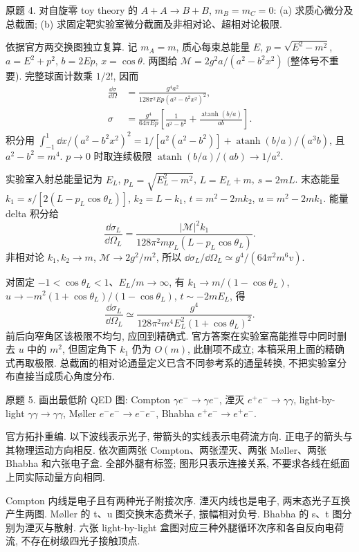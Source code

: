 \begin{exercise}\label{ex:8701-2-4}
原题 4. 对自旋零 toy theory 的 $A+A\to B+B$, $m_B=m_C=0$: (a) 求质心微分及总截面; (b) 求固定靶实验室微分截面及非相对论、超相对论极限.
\end{exercise}
\begin{solution}
依据官方两交换图独立复算. 记 $m_A=m$, 质心每束总能量 $E$, $p=\sqrt{E^2-m^2}$, $a=E^2+p^2$, $b=2Ep$, $x=\cos\theta$. 两图给 $\mathcal M=2g^2a/(a^2-b^2x^2)$ (整体号不重要). 完整球面计数乘 $1/2!$, 因而
\begin{align*}
 \frac{\dd\sigma}{\dd\Omega}&=\frac{g^4a^2}{128\pi^2E p(a^2-b^2x^2)^2},\\
 \sigma&=\frac{g^4}{64\pi E p}
 \left[\frac1{a^2-b^2}+\frac{\operatorname{atanh}(b/a)}{ab}\right].
\end{align*}
积分用 $\int_{-1}^1\dd x/(a^2-b^2x^2)^2=1/[a^2(a^2-b^2)]+\operatorname{atanh}(b/a)/(a^3b)$, 且 $a^2-b^2=m^4$. $p\to0$ 时取连续极限 $\operatorname{atanh}(b/a)/(ab)\to1/a^2$.

实验室入射总能量记为 $E_L$, $p_L=\sqrt{E_L^2-m^2}$, $L=E_L+m$, $s=2mL$. 末态能量 $k_1=s/[2(L-p_L\cos\theta_L)]$, $k_2=L-k_1$, $t=m^2-2mk_2$, $u=m^2-2mk_1$. 能量 delta 积分给
\begin{equation}
 \frac{\dd\sigma_L}{\dd\Omega_L}=\frac{|\mathcal M|^2k_1}{128\pi^2mp_L(L-p_L\cos\theta_L)}.
\end{equation}
非相对论 $k_1,k_2\to m$, $\mathcal M\to2g^2/m^2$, 所以 $\dd\sigma_L/\dd\Omega_L\simeq g^4/(64\pi^2m^6v)$.

对固定 $-1<\cos\theta_L<1$、$E_L/m\to\infty$, 有 $k_1\to m/(1-\cos\theta_L)$, $u\to-m^2(1+\cos\theta_L)/(1-\cos\theta_L)$, $t\sim-2mE_L$, 得
\begin{equation}
 \frac{\dd\sigma_L}{\dd\Omega_L}\simeq
 \frac{g^4}{128\pi^2m^4E_L^2(1+\cos\theta_L)^2}.
\end{equation}
前后向窄角区该极限不均匀, 应回到精确式. 官方答案在实验室高能推导中同时删去 $u$ 中的 $m^2$, 但固定角下 $k_1$ 仍为 $O(m)$, 此删项不成立; 本稿采用上面的精确式再取极限. 总截面的相对论通量定义已含不同参考系的通量转换, 不把实验室分布直接当成质心角度分布.
\end{solution}

\begin{exercise}\label{ex:8701-2-5}
原题 5. 画出最低阶 QED 图: Compton $\gamma e^-\to\gamma e^-$, 湮灭 $e^+e^-\to\gamma\gamma$, light-by-light $\gamma\gamma\to\gamma\gamma$, Møller $e^-e^-\to e^-e^-$, Bhabha $e^+e^-\to e^+e^-$.
\end{exercise}
\begin{solution}
官方拓扑重编. 以下波线表示光子, 带箭头的实线表示电荷流方向. 正电子的箭头与其物理运动方向相反. 依次画两张 Compton、两张湮灭、两张 Møller、两张 Bhabha 和六张电子盒. 全部外腿有标签; 图形只表示连接关系, 不要求各线在纸面上同实际动量方向相同.

Compton 内线是电子且有两种光子附接次序. 湮灭内线也是电子, 两末态光子互换产生两图. Møller 的 t、u 图交换末态费米子, 振幅相对负号. Bhabha 的 s、t 图分别为湮灭与散射. 六张 light-by-light 盒图对应三种外腿循环次序和各自反向电荷流, 不存在树级四光子接触顶点.
\end{solution}
